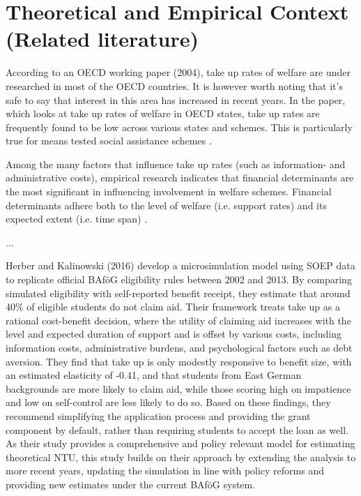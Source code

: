 \section{Theoretical and Empirical Context (Related literature)}
\label{section:theoretical_empirical_context}

According to an OECD working paper (2004), take up rates of welfare are under researched in most of the OECD countries. It is however worth noting that it’s safe to say that interest in this area has increased in recent years. In the paper, which looks at take up rates of welfare in OECD states, take up rates are frequently found to be low across various states and schemes. This is particularly true for means tested social assistance schemes \citep{hernanz_oecd_2004}.

Among the many factors that influence take up rates (such as information- and administrative costs), empirical research indicates that financial determinants are the most significant in influencing involvement in welfare schemes. Financial determinants adhere both to the level of welfare (i.e. support rates) and its expected extent (i.e. time span) \citep{hernanz_oecd_2004}.

...

Herber and Kalinowski (2016) develop a microsimulation model using SOEP data to replicate official BAföG eligibility rules between 2002 and 2013. By comparing simulated eligibility with self-reported benefit receipt, they estimate that around 40\% of eligible students do not claim aid. Their framework treats take up as a rational cost-benefit decision, where the utility of claiming aid increases with the level and expected duration of support and is offset by various costs, including information costs, administrative burdens, and psychological factors such as debt aversion. They find that take up is only modestly responsive to benefit size, with an estimated elasticity of -0.41, and that students from East German backgrounds are more likely to claim aid, while those scoring high on impatience and low on self-control are less likely to do so. Based on these findings, they recommend simplifying the application process and providing the grant component by default, rather than requiring students to accept the loan as well. As their study provides a comprehensive and policy relevant model for estimating theoretical NTU, this study builds on their approach by extending the analysis to more recent years, updating the simulation in line with policy reforms and providing new estimates under the current BAföG system.

